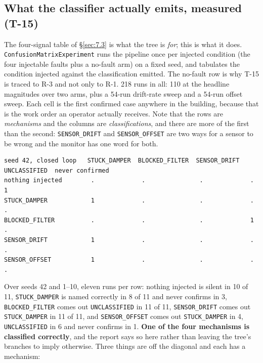 \subsection{What the classifier actually emits, measured (T-15)}\label{sec:D.2}

The four-signal table of §\ref{sec:7.3} is what the tree is \emph{for}; this is what it
does. \texttt{ConfusionMatrixExperiment} runs the pipeline once per
injected condition (the four injectable faults plus a no-fault arm) on a fixed seed, and
tabulates the condition injected against the classification emitted. The no-fault row is why T-15
is traced to R-3 and not only to R-1. 218 runs in all: 110 at the headline magnitudes over two arms,
plus a 54-run drift-rate sweep and a 54-run offset sweep. Each cell is the first confirmed case
anywhere in the building, because that is the work order an operator actually receives. Note that
the rows are \emph{mechanisms} and the columns are \emph{classifications}, and there are more of the
first than the second: \texttt{SENSOR\_DRIFT} and \texttt{SENSOR\_OFFSET} are two ways for a sensor
to be wrong and the monitor has one word for both.

\begin{footnotesize}
\begin{verbatim}
seed 42, closed loop   STUCK_DAMPER  BLOCKED_FILTER  SENSOR_DRIFT  UNCLASSIFIED  never confirmed
nothing injected        .             .               .             .             1
STUCK_DAMPER            1             .               .             .             .
BLOCKED_FILTER          .             .               .             1             .
SENSOR_DRIFT            1             .               .             .             .
SENSOR_OFFSET           1             .               .             .             .
\end{verbatim}
\end{footnotesize}

Over seeds 42 and 1--10, eleven runs per row: nothing injected is silent in 10 of 11,
\texttt{STUCK\_DAMPER} is named correctly in 8 of 11 and never confirms in 3, \texttt{BLOCKED\_FILTER}
comes out \texttt{UNCLASSIFIED} in 11 of 11, \texttt{SENSOR\_DRIFT} comes out \texttt{STUCK\_DAMPER}
in 11 of 11, and \texttt{SENSOR\_OFFSET} comes out \texttt{STUCK\_DAMPER} in 4, \texttt{UNCLASSIFIED}
in 6 and never confirms in 1. \textbf{One of the four mechanisms is classified correctly}, and the
report says so here rather than leaving the tree's branches to imply otherwise. Three things are off
the diagonal and each has a mechanism:

